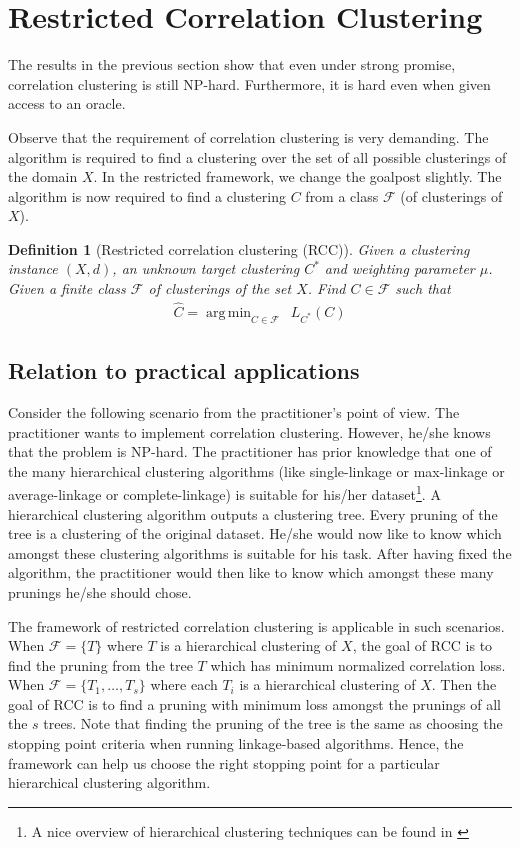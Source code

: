 \documentclass[12pt]{article}
\newtheorem{definition}[theorem]{Definition}
\newcommand{\mc}{\mathcal}
\DeclareMathOperator*{\argmin}{arg\,min}
\begin{document}
\fi

\section{Restricted Correlation Clustering}
\label{section:RCC}

The results in the previous section show that even under strong promise, correlation clustering is still NP-hard. Furthermore, it is hard even when given access to an oracle. 

Observe that the requirement of correlation clustering is very demanding. The algorithm is required to find a clustering over the set of all possible clusterings of the domain $X$. In the restricted framework, we change the goalpost slightly. The algorithm is now required to find a clustering $C$ from a class $\mc F$ (of clusterings of $X$). 

\begin{definition}[Restricted correlation clustering (RCC)]
\label{defn:rcc}
Given a clustering instance $(X, d)$, an unknown target clustering $C^*$ and weighting parameter $\mu$. Given a finite class $\mc F$ of clusterings of the set $X$. Find $C \in \mc F$ such that 
\begin{align}
\hat C = \argmin_{C \in \mc F} \enspace L_{C^*}(C)\label{eqn:RCCMain}
\end{align}
\end{definition}

\subsection{Relation to practical applications}
Consider the following scenario from the practitioner's point of view. The practitioner wants to implement correlation clustering. However, he/she knows that the problem is NP-hard. The practitioner has prior knowledge that one of the many hierarchical clustering algorithms (like single-linkage or max-linkage or average-linkage or complete-linkage) is suitable for his/her dataset\footnote{A nice overview of hierarchical clustering techniques can be found in \cite{maimon2009nhecd}}. A hierarchical clustering algorithm outputs a clustering tree. Every pruning of the tree is a clustering of the original dataset. He/she would now like to know which amongst these clustering algorithms is suitable for his task. After having fixed the algorithm, the practitioner would then  like to know which amongst these many prunings he/she should chose. 

The framework of restricted correlation clustering is applicable in such scenarios. When $\mc F = \{T\}$ where $T$ is a hierarchical clustering of $X$, the goal of RCC is to find the pruning from the tree $T$ which has minimum normalized correlation loss. When $\mc F = \{T_1, \ldots, T_s\}$ where each $T_i$ is a hierarchical clustering of $X$. Then the goal of RCC is to find a pruning with minimum loss amongst the prunings of all the $s$ trees. Note that finding the pruning of the tree is the same as choosing the stopping point criteria when running linkage-based algorithms. Hence, the framework can help us choose the right stopping point for a particular hierarchical clustering algorithm.
\end{document}
